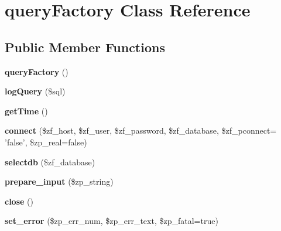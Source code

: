 \hypertarget{classquery_factory}{
\section{queryFactory Class Reference}
\label{classquery_factory}
}
\subsection*{Public Member Functions}
\begin{DoxyCompactItemize}
\item 
\hypertarget{classquery_factory_a248a0eeb9aa34ec8b58996e7ff5790d8}{
{\bfseries queryFactory} ()}
\label{classquery_factory_a248a0eeb9aa34ec8b58996e7ff5790d8}

\item 
\hypertarget{classquery_factory_a9bcd88ab2727c9e6ed31091f992309a7}{
{\bfseries logQuery} (\$sql)}
\label{classquery_factory_a9bcd88ab2727c9e6ed31091f992309a7}

\item 
\hypertarget{classquery_factory_a57c78d9f0aa316ee2fdd6995e2a06ce3}{
{\bfseries getTime} ()}
\label{classquery_factory_a57c78d9f0aa316ee2fdd6995e2a06ce3}

\item 
\hypertarget{classquery_factory_ad10fc7f02bd242aecd7ca5a1311c95da}{
{\bfseries connect} (\$zf\_\-host, \$zf\_\-user, \$zf\_\-password, \$zf\_\-database, \$zf\_\-pconnect= 'false', \$zp\_\-real=false)}
\label{classquery_factory_ad10fc7f02bd242aecd7ca5a1311c95da}

\item 
\hypertarget{classquery_factory_ae95ac0aae1a3cf01948d1e2b2c461732}{
{\bfseries selectdb} (\$zf\_\-database)}
\label{classquery_factory_ae95ac0aae1a3cf01948d1e2b2c461732}

\item 
\hypertarget{classquery_factory_a6ca572f8f534e52841b2eaec5e45e4ba}{
{\bfseries prepare\_\-input} (\$zp\_\-string)}
\label{classquery_factory_a6ca572f8f534e52841b2eaec5e45e4ba}

\item 
\hypertarget{classquery_factory_aa69c8bf1f1dcf4e72552efff1fe3e87e}{
{\bfseries close} ()}
\label{classquery_factory_aa69c8bf1f1dcf4e72552efff1fe3e87e}

\item 
\hypertarget{classquery_factory_a3ba3ce5cc42b5fcbbbe0b7e442d2d7bf}{
{\bfseries set\_\-error} (\$zp\_\-err\_\-num, \$zp\_\-err\_\-text, \$zp\_\-fatal=true)}
\label{classquery_factory_a3ba3ce5cc42b5fcbbbe0b7e442d2d7bf}


\end{DoxyCompactItemize}
